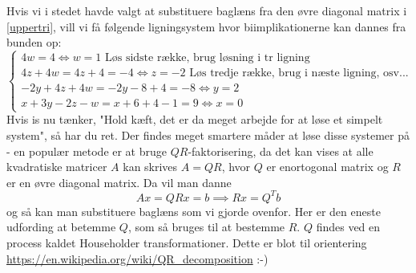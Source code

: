 \documentclass{article}
\begin{document}
Hvis vi i stedet havde valgt at substituere baglæns fra den øvre diagonal matrix i \eqref{uppertri}, vill vi få følgende ligningsystem hvor biimplikationerne kan dannes fra bunden op:
\begin{equation}
\begin{cases}
4w = 4  \iff w = 1 \text{ Løs sidste række, brug løsning i tr ligning}\\ 
4z + 4w =4z + 4 = -4 \iff z = -2 \text{ Løs tredje række, brug i næste ligning, osv...}\\
-2y + 4z + 4w = -2y - 8 + 4 = -8 \iff y = 2\\
x + 3y - 2z - w = x + 6 + 4 - 1 = 9 \iff x = 0
\end{cases}
\end{equation}
Hvis is nu tænker, "Hold kæft, det er da meget arbejde for at løse et simpelt system", så har du ret. Der findes meget smartere måder at løse disse systemer på - en populær metode er at bruge $QR$-faktorisering, da det kan vises at alle  kvadratiske matricer $A$ kan skrives $A = QR$, hvor $Q$ er enortogonal matrix og $R$ er en øvre diagonal matrix. Da vil man danne 
$$ Ax = QRx = b \implies Rx = Q^Tb$$
og så kan man substituere baglæns som vi gjorde ovenfor. Her er den eneste udfording at betemme $Q$, som så bruges til at bestemme $R$. $Q$ findes ved en process kaldet Householder transformationer. Dette er blot til orientering \url{https://en.wikipedia.org/wiki/QR_decomposition} :-)
\end{document}
